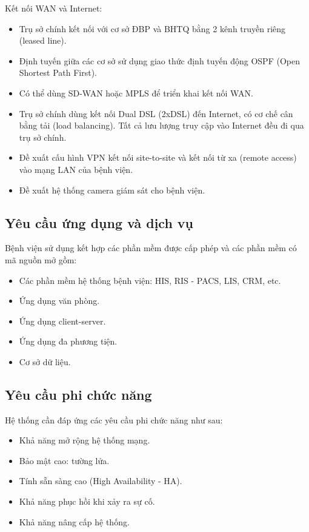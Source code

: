 Kết nối WAN và Internet:
\begin{itemize}
    \item Trụ sở chính kết nối với cơ sở ĐBP và BHTQ bằng 2 kênh truyền riêng (leased line).
    \item Định tuyến giữa các cơ sở sử dụng giao thức định tuyến động OSPF (Open Shortest Path First).
    \item Có thể dùng SD-WAN hoặc MPLS để triển khai kết nối WAN.
    \item Trụ sở chính dùng kết nối Dual DSL (2xDSL) đến Internet, có cơ chế cân bằng tải (load balancing). Tất cả lưu lượng truy cập vào Internet đều đi qua trụ sở chính.
    \item Đề xuất cấu hình VPN kết nối site-to-site và kết nối từ xa (remote access) vào mạng LAN của bệnh viện.
    \item Đề xuất hệ thống camera giám sát cho bệnh viện.
\end{itemize}


\subsection{Yêu cầu ứng dụng và dịch vụ}
Bệnh viện sử dụng kết hợp các phần mềm được cấp phép và các phần mềm có mã nguồn mở gồm:
\begin{itemize}
    \item Các phần mềm hệ thống bệnh viện: HIS, RIS - PACS, LIS, CRM, etc.
    \item Ứng dụng văn phòng.
    \item Ứng dụng client-server.
    \item Ứng dụng đa phương tiện.
    \item Cơ sở dữ liệu.
\end{itemize}


\subsection{Yêu cầu phi chức năng}
Hệ thống cần đáp ứng các yêu cầu phi chức năng như sau:
\begin{itemize}
    \item Khả năng mở rộng hệ thống mạng.
    \item Bảo mật cao: tường lửa.
    \item Tính sẵn sàng cao (High Availability - HA).
    \item Khả năng phục hồi khi xảy ra sự cố.
    \item Khả năng nâng cấp hệ thống.
\end{itemize}

